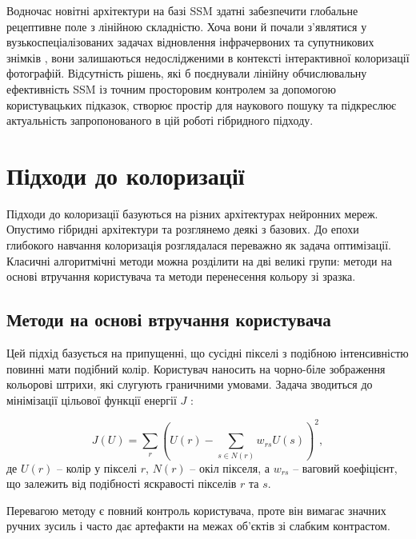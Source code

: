         Водночас новітні архітектури на базі SSM здатні забезпечити глобальне рецептивне поле з лінійною складністю.
        Хоча вони й почали з'являтися у вузькоспеціалізованих задачах відновлення інфрачервоних \cite{2024-colormamba, 2026-haqagen} та супутникових знімків \cite{2026-mfmamba}, вони залишаються недослідженими в контексті інтерактивної колоризації фотографій.
        Відсутність рішень, які б поєднували лінійну обчислювальну ефективність SSM із точним просторовим контролем за допомогою користувацьких підказок, створює простір для наукового пошуку та підкреслює актуальність запропонованого в цій роботі гібридного підходу.
    
    \section{Підходи до колоризації}

        Підходи до колоризації базуються на різних архітектурах нейронних мереж.
        Опустимо гібридні архітектури та розглянемо деякі з базових.
        До епохи глибокого навчання колоризація розглядалася переважно як задача оптимізації.
        Класичні алгоритмічні методи можна розділити на дві великі групи: методи на основі втручання користувача та методи перенесення кольору зі зразка.

        \subsection{Методи на основі втручання користувача}
            Цей підхід базується на припущенні, що сусідні пікселі з подібною інтенсивністю повинні мати подібний колір.
            Користувач наносить на чорно-біле зображення кольорові штрихи, які слугують граничними умовами.
            Задача зводиться до мінімізації цільової функції енергії $J$ \cite{2004-colorization-using-optimization}:

            \begin{equation*}
                J(U) = \sum_{r} \left( U(r) - \sum_{s \in N(r)} w_{rs} U(s) \right)^2,            
            \end{equation*}
            де $U(r)$ -- колір у пікселі $r$, $N(r)$ -- окіл пікселя, а $w_{rs}$ -- ваговий коефіцієнт, що залежить від подібності яскравості пікселів $r$ та $s$.

            Перевагою методу є повний контроль користувача, проте він вимагає значних ручних зусиль і часто дає артефакти на межах об'єктів зі слабким контрастом.

